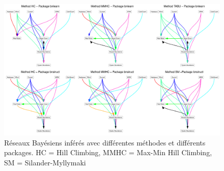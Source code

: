 \documentclass[12pt]{report}
\begin{document}
\begin{figure}
    \centering
    \includegraphics[height = \textwidth, width = .9\textheight,angle = 90]{all_bn.pdf}
    \caption[]{Réseaux Bayésiens inférés avec différentes méthodes et différents packages. HC = Hill Climbing, MMHC = Max-Min Hill Climbing, SM = Silander-Myllymaki}
    \label{fig:6anx}
\end{figure}

\cleardoublepage 


\end{document}
